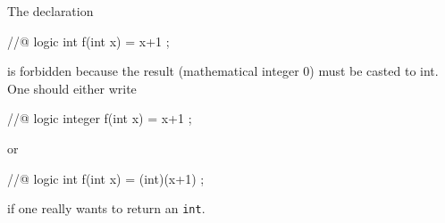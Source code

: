 \begin{example}
  The declaration
  \begin{c}
    //@ logic int f(int x) = x+1 ;
  \end{c}
  is forbidden because the result (mathematical integer 0) must be
  casted to int.  One should either write
  \begin{c}
    //@ logic integer f(int x) = x+1 ;
  \end{c}
  or
  \begin{c}
    //@ logic int f(int x) = (int)(x+1) ;
  \end{c}
if one really wants to return an \verb|int|.
\end{example}